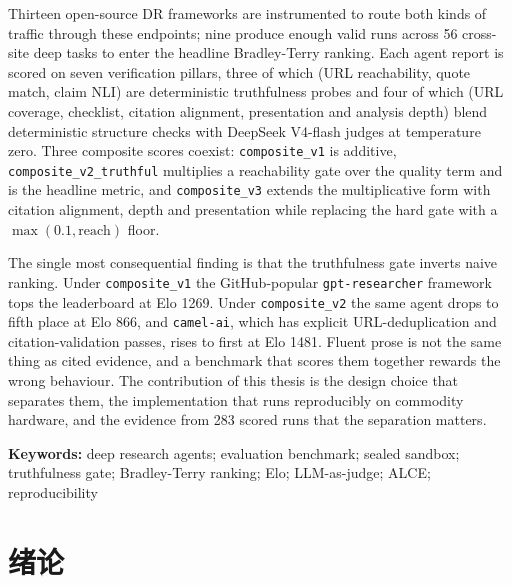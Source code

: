 \documentclass[UTF8,a4paper,12pt,oneside]{ctexart}
\begin{document}
Thirteen open-source DR frameworks are instrumented to route both kinds of traffic through these endpoints; nine produce enough valid runs across 56 cross-site deep tasks to enter the headline Bradley-Terry ranking. Each agent report is scored on seven verification pillars, three of which (URL reachability, quote match, claim NLI) are deterministic truthfulness probes and four of which (URL coverage, checklist, citation alignment, presentation and analysis depth) blend deterministic structure checks with DeepSeek V4-flash judges at temperature zero. Three composite scores coexist: \texttt{composite\_v1} is additive, \texttt{composite\_v2\_truthful} multiplies a reachability gate over the quality term and is the headline metric, and \texttt{composite\_v3} extends the multiplicative form with citation alignment, depth and presentation while replacing the hard gate with a \(\max(0.1, \text{reach})\) floor.

The single most consequential finding is that the truthfulness gate inverts naive ranking. Under \texttt{composite\_v1} the GitHub-popular \texttt{gpt-researcher} framework tops the leaderboard at Elo 1269. Under \texttt{composite\_v2} the same agent drops to fifth place at Elo 866, and \texttt{camel-ai}, which has explicit URL-deduplication and citation-validation passes, rises to first at Elo 1481. Fluent prose is not the same thing as cited evidence, and a benchmark that scores them together rewards the wrong behaviour. The contribution of this thesis is the design choice that separates them, the implementation that runs reproducibly on commodity hardware, and the evidence from 283 scored runs that the separation matters.

\vspace{1em}
\noindent\textbf{Keywords:} deep research agents; evaluation benchmark; sealed sandbox; truthfulness gate; Bradley-Terry ranking; Elo; LLM-as-judge; ALCE; reproducibility

\clearpage
\tableofcontents
\clearpage


\section{绪论}
\end{document}
